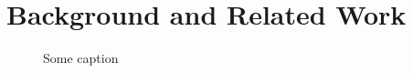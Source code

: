 \section{Background and Related Work}

\cite{kari2021transformr}

\begin{figure}[t]
    \centering
    \caption{
        \textnormal{Some caption}
    }
    \label{fig:background}
\end{figure}
